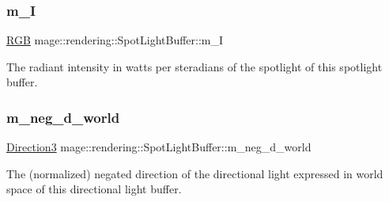 \subsubsection{\texorpdfstring{m\+\_\+I}{m\_I}}
{\footnotesize\ttfamily \mbox{\hyperlink{structmage_1_1_r_g_b}{R\+GB}} mage\+::rendering\+::\+Spot\+Light\+Buffer\+::m\+\_\+I}

The radiant intensity in watts per steradians of the spotlight of this spotlight buffer. \mbox{\label{structmage_1_1rendering_1_1_spot_light_buffer_a66c4eccce12de2ee271877665eb3c3a3}} 
\subsubsection{\texorpdfstring{m\+\_\+neg\+\_\+d\+\_\+world}{m\_neg\_d\_world}}
{\footnotesize\ttfamily \mbox{\hyperlink{structmage_1_1_direction3}{Direction3}} mage\+::rendering\+::\+Spot\+Light\+Buffer\+::m\+\_\+neg\+\_\+d\+\_\+world}

The (normalized) negated direction of the directional light expressed in world space of this directional light buffer. 